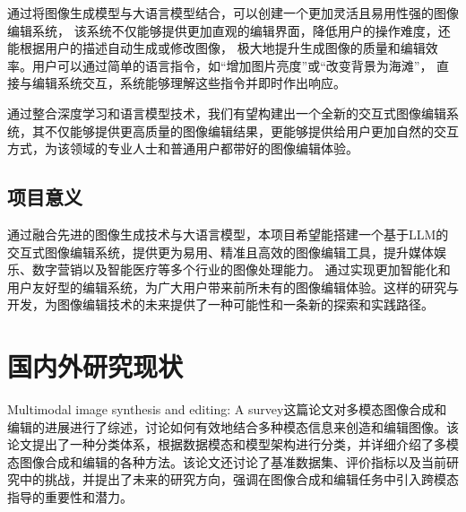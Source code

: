 \documentclass[a4paper,AutoFakeBold,oneside,12pt]{book}
\begin{document}
通过将图像生成模型与大语言模型结合，可以创建一个更加灵活且易用性强的图像编辑系统，
该系统不仅能够提供更加直观的编辑界面，降低用户的操作难度，还能根据用户的描述自动生成或修改图像，
极大地提升生成图像的质量和编辑效率。用户可以通过简单的语言指令，如“增加图片亮度”或“改变背景为海滩”，
直接与编辑系统交互，系统能够理解这些指令并即时作出响应。

通过整合深度学习和语言模型技术，我们有望构建出一个全新的交互式图像编辑系统，其不仅能够提供更高质量的图像编辑结果，更能够提供给用户更加自然的交互方式，为该领域的专业人士和普通用户都带好的图像编辑体验。
\subsection{项目意义}
通过融合先进的图像生成技术与大语言模型，本项目希望能搭建一个基于LLM的交互式图像编辑系统，提供更为易用、精准且高效的图像编辑工具，提升媒体娱乐、数字营销以及智能医疗等多个行业的图像处理能力。
通过实现更加智能化和用户友好型的编辑系统，为广大用户带来前所未有的图像编辑体验。这样的研究与开发，为图像编辑技术的未来提供了一种可能性和一条新的探索和实践路径。
\section{国内外研究现状}
Multimodal image synthesis and editing: A survey\cite{zhan2022multimodal}这篇论文对多模态图像合成和编辑的进展进行了综述，讨论如何有效地结合多种模态信息来创造和编辑图像。该论文提出了一种分类体系，根据数据模态和模型架构进行分类，并详细介绍了多模态图像合成和编辑的各种方法。该论文还讨论了基准数据集、评价指标以及当前研究中的挑战，并提出了未来的研究方向，强调在图像合成和编辑任务中引入跨模态指导的重要性和潜力。
\end{document}
